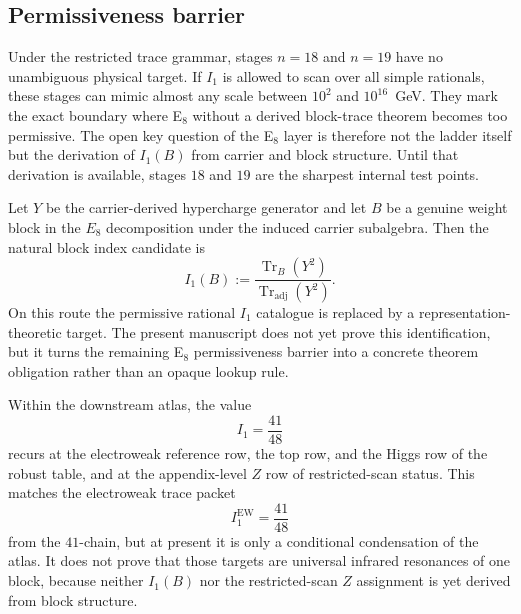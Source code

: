 \subsection{Permissiveness barrier}

\begin{remark}[Permissiveness barrier at $n=18{,}19$]
Under the restricted trace grammar, stages $n=18$ and $n=19$ have no unambiguous physical target. If $I_1$ is allowed to scan over all simple rationals, these stages can mimic almost any scale between $10^2$ and $10^{16}$~GeV. They mark the exact boundary where E$_8$ without a derived block-trace theorem becomes too permissive. The open key question of the E$_8$ layer is therefore not the ladder itself but the derivation of $I_1(B)$ from carrier and block structure. Until that derivation is available, stages $18$ and $19$ are the sharpest internal test points.
\end{remark}

\begin{conjecture}
Let $Y$ be the carrier-derived hypercharge generator and let $B$ be a genuine weight block in the $E_8$ decomposition under the induced carrier subalgebra. Then the natural block index candidate is
\[
I_1(B):=\frac{\operatorname{Tr}_B(Y^2)}{\operatorname{Tr}_{\mathrm{adj}}(Y^2)}.
\]
On this route the permissive rational $I_1$ catalogue is replaced by a representation-theoretic target. The present manuscript does not yet prove this identification, but it turns the remaining E$_8$ permissiveness barrier into a concrete theorem obligation rather than an opaque lookup rule.
\end{conjecture}

\begin{remark}
Within the downstream atlas, the value
\[
I_1=\frac{41}{48}
\]
recurs at the electroweak reference row, the top row, and the Higgs row of the robust table, and at the appendix-level $Z$ row of restricted-scan status. This matches the electroweak trace packet
\[
I_1^{\mathrm{EW}}=\frac{41}{48}
\]
from the $41$-chain, but at present it is only a conditional condensation of the atlas. It does not prove that those targets are universal infrared resonances of one block, because neither $I_1(B)$ nor the restricted-scan $Z$ assignment is yet derived from block structure.
\end{remark}

